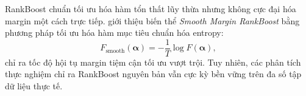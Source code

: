 \begin{tcolorbox}[colback=extensioncolor, colframe=yellow!60!black, title={\textbf{[MỞ RỘNG] Smooth Margin RankBoost và tối ưu lề thực tế}}]
RankBoost chuẩn tối ưu hóa hàm tổn thất lũy thừa nhưng không cực đại hóa margin một cách trực tiếp. \citet{rudin2005margin} giới thiệu biến thể \textit{Smooth Margin RankBoost} bằng phương pháp tối ưu hóa hàm mục tiêu chuẩn hóa entropy:
\[
    F_{\text{smooth}}(\bm{\alpha}) = -\frac{1}{T}\log F(\bm{\alpha}),
\]
chỉ ra tốc độ hội tụ margin tiệm cận tối ưu vượt trội. Tuy nhiên, các phân tích thực nghiệm chỉ ra RankBoost nguyên bản vẫn cực kỳ bền vững trên đa số tập dữ liệu thực tế.
\end{tcolorbox}
